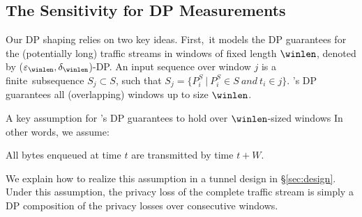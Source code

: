 


\subsection{The Sensitivity for DP Measurements}
\label{subsec:sensitivity}

Our DP shaping relies on two key ideas.
First,~it models the DP guarantees for the (potentially long) traffic streams in
windows of fixed length $\winlen$, denoted by \mbox{($\varepsilon_{\winlen},
\delta_{\winlen}$)-DP}.
An input sequence over window $j$ is a finite~sub\-sequence $S_{j} \subset S$,
such that
$S_{j} = \{ P^S_i~|~P^S_i \in S~and~t_i \in j \}$.
{\sys}'s DP guarantees  all (overlapping) windows up to size
$\winlen$.

A key assumption for {\sys}'s DP guarantees to hold over $\winlen$-sized windows
In other words, we assume:
\begin{assumption}\label{assumption:window}
  All bytes enqueued  at time $t$ are transmitted by time
  $t+W$.
\end{assumption}
We explain how to realize this assumption in a tunnel design in
\S\ref{sec:design}.
Under this assumption, the privacy loss of the complete traffic stream is
simply a DP composition of the privacy losses over consecutive windows.

